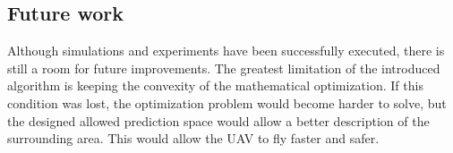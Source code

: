 \documentclass[a4paper,11pt,titlepage]{article}
\begin{document}
\subsection{Future work}
Although simulations and experiments have been successfully executed, there is still a room for future improvements. The greatest limitation of the introduced algorithm is keeping the convexity of the mathematical optimization. If this condition was lost, the optimization problem would become harder to solve, but the designed allowed prediction space would allow a better description of the surrounding area. This would allow the UAV to fly faster and safer.
\end{document}
